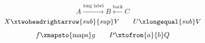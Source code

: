 \documentclass{article}
\begin{document}
\[ A \xrightarrow{\text{long label}} B \xleftarrow{\text{back}} C \]
\[ X \xtwoheadrightarrow{sub}{sup} Y \qquad U \xlongequal{sub} V \]
\[ f \xmapsto{\text{maps}} g \qquad P \xtofrom{a}{b} Q \]
\end{document}
